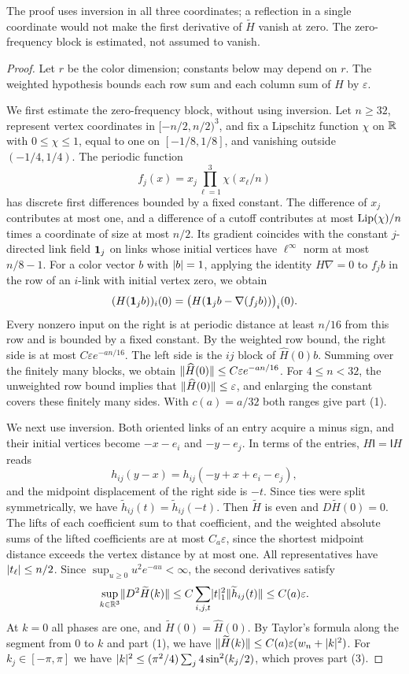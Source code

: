 The proof uses inversion in all three coordinates; a reflection in a single coordinate would not make the first derivative of $\widetilde H$ vanish at zero. The zero-frequency block is estimated, not assumed to vanish.

\begin{proof}
Let $r$ be the color dimension; constants below may depend on $r$. The weighted hypothesis bounds each row sum and each column sum of $H$ by $\varepsilon$.

We first estimate the zero-frequency block, without using inversion. Let $n\ge32$, represent vertex coordinates in $[-n/2,n/2)^3$, and fix a Lipschitz function $\chi$ on $\mathbb R$ with $0\le\chi\le1$, equal to one on $[-1/8,1/8]$, and vanishing outside $(-1/4,1/4)$. The periodic function
\[
 f_j(x)=x_j\prod_{\ell=1}^3\chi(x_\ell/n)
\]
has discrete first differences bounded by a fixed constant. The difference of $x_j$ contributes at most one, and a difference of a cutoff contributes at most $\operatorname{Lip}(\chi)/n$ times a coordinate of size at most $n/2$. Its gradient coincides with the constant $j$-directed link field $\mathbf 1_j$ on links whose initial vertices have $\ell^\infty$ norm at most $n/8-1$. For a color vector $b$ with $\lvert b\rvert=1$, applying the identity $H\nabla=0$ to $f_jb$ in the row of an $i$-link with initial vertex zero, we obtain
\[
 (H(\mathbf 1_jb))_i(0)=\bigl(H(\mathbf 1_jb-\nabla(f_jb))\bigr)_i(0).
\]
Every nonzero input on the right is at periodic distance at least $n/16$ from this row and is bounded by a fixed constant. By the weighted row bound, the right side is at most $C\varepsilon e^{-an/16}$. The left side is the $ij$ block of $\widehat H(0)b$. Summing over the finitely many blocks, we obtain $\lVert \widehat H(0)\rVert\le C\varepsilon e^{-an/16}$. For $4\le n<32$, the unweighted row bound implies that $\lVert \widehat H(0)\rVert\le\varepsilon$, and enlarging the constant covers these finitely many sides. With $c(a)=a/32$ both ranges give part (1).

We next use inversion. Both oriented links of an entry acquire a minus sign, and their initial vertices become $-x-e_i$ and $-y-e_j$. In terms of the entries, $H\mathsf I=\mathsf IH$ reads
\[
 h_{ij}(y-x)=h_{ij}(-y+x+e_i-e_j),
\]
and the midpoint displacement of the right side is $-t$. Since ties were split symmetrically, we have $\widetilde h_{ij}(t)=\widetilde h_{ij}(-t)$. Then $\widetilde H$ is even and $D\widetilde H(0)=0$. The lifts of each coefficient sum to that coefficient, and the weighted absolute sums of the lifted coefficients are at most $C_a\varepsilon$, since the shortest midpoint distance exceeds the vertex distance by at most one. All representatives have $\lvert t_\ell\rvert\le n/2$. Since $\sup_{u\ge0}u^2e^{-au}<\infty$, the second derivatives satisfy
\[
 \sup_{k\in\mathbb R^3}\lVert D^2\widetilde H(k)\rVert\le C\sum_{i,j,t}\lvert t\rvert_1^2\lVert \widetilde h_{ij}(t)\rVert\le C(a)\varepsilon.
\]
At $k=0$ all phases are one, and $\widetilde H(0)=\widehat H(0)$. By Taylor's formula along the segment from $0$ to $k$ and part (1), we have $\lVert \widetilde H(k)\rVert\le C(a)\varepsilon(w_n+\lvert k\rvert^2)$. For $k_j\in[-\pi,\pi]$ we have $\lvert k\rvert^2\le(\pi^2/4)\sum_j4\sin^2(k_j/2)$, which proves part (3).


\end{proof}
